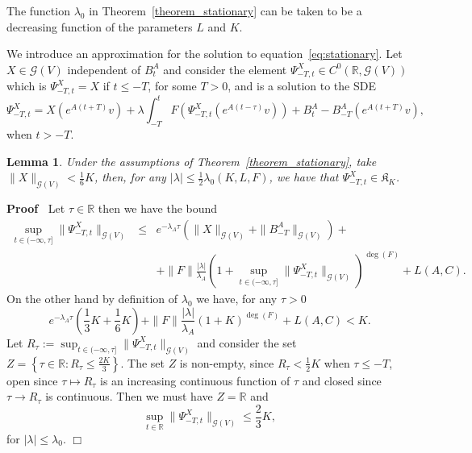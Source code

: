 \documentclass{article}
\newcommand{\assign}{:=}
\newenvironment{proof}{\noindent\textbf{Proof\ }}{\hspace*{\fill}$\Box$\medskip}
\newtheorem{lemma}[theorem]{Lemma}
\begin{document}
\begin{remark}
  \label{remark_lambda0}The function $\lambda_0$ in
  Theorem~\ref{theorem_stationary} can be taken to be a decreasing function of
  the parameters $L$ and $K$.
\end{remark}

We introduce an approximation for the solution to
equation~{\eqref{eq:stationary}}. Let $X \in \mathcal{G} (V)$ independent of
$B^A_t$ and consider the element $\Psi_{- T, t}^X \in C^0 (\mathbb{R},
\mathcal{G} (V))$ which is $\Psi_{- T, t}^X = X$ if $t \leqslant - T$, for
some $T > 0$, and is a solution to the SDE
\[ \Psi_{- T, t}^X = X (e^{A (t + T)} v) + \lambda \int_{- T}^t F (\Psi_{- T,
   t}^X (e^{A (t - \tau)} v)) + B^A_t - B^A_{- T} (e^{A (t + T)} v), \]
when $t > - T$.

\begin{lemma}
  \label{lemma_bound}Under the assumptions of
  Theorem~\ref{theorem_stationary}, take $\| X \|_{\mathcal{G} (V)} <
  \frac{1}{6} K$, then, for any $| \lambda | \leqslant \frac{1}{2} \lambda_0
  (K, L, F)$, we have that $\Psi_{- T, t}^X \in \mathfrak{K}_K$.
\end{lemma}

\begin{proof}
  Let $\tau \in \mathbb{R}$ then we have the bound
  \begin{eqnarray}
    \sup_{t \in (- \infty, \tau]} \| \Psi^X_{- T, t} \|_{\mathcal{G} (V)} &
    \leqslant & e^{- \lambda_A \tau} (\| X \|_{\mathcal{G} (V)} + \| B_{- T}^A
    \|_{\mathcal{G} (V)}) + \nonumber\\
    &  & + \| F \| \frac{| \lambda |}{\lambda_A} (1 + \sup_{t \in (- \infty,
    \tau]} \| \Psi_{- T, t}^X \|_{\mathcal{G} (V)})^{\deg (F)} + L (A, C) .
    \nonumber
  \end{eqnarray}
  On the other hand by definition of $\lambda_0$ we have, for any $\tau > 0$
  \[ e^{- \lambda_A \tau} \left( \frac{1}{3} K + \frac{1}{6} K \right) + \| F
     \| \frac{| \lambda |}{\lambda_A} (1 + K)^{\deg (F)} + L (A, C) < K. \]
  Let $R_{\tau} \assign \sup_{t \in (- \infty, \tau]} \| \Psi_{- T, t}^X
  \|_{\mathcal{G} (V)}$ and consider the set $Z = \left\{ \tau \in \mathbb{R}:
  R_{\tau} \leqslant \frac{2 K}{3} \right\}$. The set $Z$ is non-empty, since
  $R_{\tau} < \frac{1}{2} K$ when $\tau \leqslant - T$, open since $\tau
  \mapsto R_{\tau}$ is an increasing continuous function of $\tau$ and closed
  since $\tau \rightarrow R_{\tau}$ is continuous. Then we must have $Z
  =\mathbb{R}$ and
  \[ \sup_{t \in \mathbb{R}} \| \Psi_{- T, t}^X \|_{\mathcal{G} (V)}
     \leqslant \frac{2}{3} K, \]
  for $| \lambda | \leqslant \lambda_0$.
\end{proof}
\end{document}
